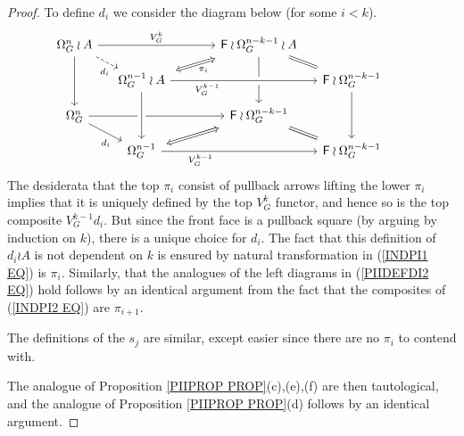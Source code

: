 \documentclass[a4paper,10pt]{article}%
\begin{document}
\begin{proof}
To define $d_i$ we consider the diagram below (for some $i<k$).
\begin{equation}\label{PICUBOIDAB EQ}
\begin{tikzcd}[column sep = small, row sep = small]
	\Omega_{G}^n \wr A \ar{rrrr}{V_G^{k}} \ar[dashed]{rd}[swap,near end]{d_i} \ar{dd}
	&&
	&&
	|[alias=FFOmegan]|\Fin \wr \Omega_G^{n-k-1} \wr A  \ar[dd] \ar[equal]{rd}
\\
	&
	|[alias=Omeganp1]|\Omega_{G}^{n-1} \wr A \ar[crossing over]{rrrr}[swap,near start]{V_G^{k-1}} &&&&
	|[alias=Omeganp2]|
	\Fin \wr \Omega_G^{n-k-1} \ar{dd}&
\\
	\Omega_{G}^{n} \ar{rrrr} \ar{rd}[swap,near end]{d_i}&&
	 &&
	|[alias=FFOmeganm1]| \Fin \wr \Omega_G^{n-k-1} \ar[rd,equal] 
\\
	&
	|[alias=Omegan]|\Omega_G^{n-1} \ar{rrrr}[swap,near start]{V_G^{k-1}} &&&&
	\Fin \wr \Omega_G^{n-k-1} &
	\arrow[Leftrightarrow, from=Omeganp1, to=FFOmegan,shorten <=0.15cm,shorten >=0.15cm,swap,"\pi_i"]
	\arrow[Leftrightarrow, from=FFOmeganm1, to=Omegan,shorten <=0.15cm,shorten >=0.15cm]
	\arrow[from=Omeganp1, to=Omegan,crossing over]
\end{tikzcd}
\end{equation}
The desiderata that the top $\pi_i$ consist of pullback arrows lifting the lower $\pi_i$ implies that it is uniquely defined by the top $V_G^k$ functor, and hence so is the top composite 
$V_G^{k-1}d_i$. But since the front face is a pullback square
(by arguing by induction on $k$), there is a unique choice for $d_i$. 
The fact that this definition of $d_i \wr A$ is not dependent on $k$ is ensured by natural transformation in (\ref{INDPI1 EQ}) is $\pi_i$.
Similarly, that the analogues of the left diagrams in 
(\ref{PIIDEFDI2 EQ})
hold follows by an identical argument from the fact that the composites of (\ref{INDPI2 EQ}) are $\pi_{i+1}$.

The definitions of the $s_j$ are similar, except easier since there are no $\pi_i$ to contend with.

The analogue of Proposition \ref{PIIPROP PROP}(c),(e),(f) are then tautological, and the analogue of 
Proposition \ref{PIIPROP PROP}(d)
follows by an identical argument.
\end{proof}
\end{document}
